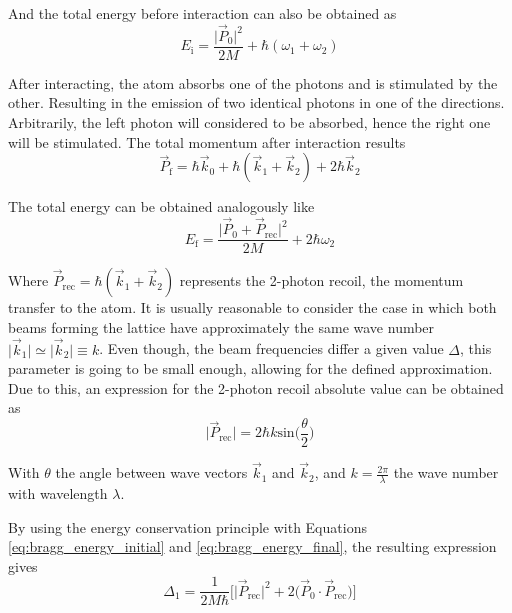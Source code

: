And the total energy before interaction can also be obtained as
\begin{equation}\label{eq:bragg_energy_initial}
	E_\text{i} = \frac{\mathopen\big|\vec{P}_0\mathclose\big|^2}{2M} + \hbar (\omega_1 + \omega_2)
\end{equation}

After interacting, the atom absorbs one of the photons and is stimulated by the other. Resulting in the emission of two identical photons in one of the directions. Arbitrarily, the left photon will considered to be absorbed, hence the right one will be stimulated. The total momentum after interaction results
\begin{equation}
	\vec{P}_\text{f} = \hbar \vec{k}_0 + \hbar (\vec{k}_1 + \vec{k}_2) + 2\hbar\vec{k}_2
\end{equation}

The total energy can be obtained analogously like 
 \begin{equation}\label{eq:bragg_energy_final}
 	E_\text{f} = \frac{\mathopen\big|\vec{P}_0+\vec{P}_\text{rec}\mathclose\big|^2}{2M} + 2\hbar\omega_2
 \end{equation}
 
Where $\vec{P}_\text{rec} = \hbar (\vec{k}_1 + \vec{k}_2)$ represents the 2-photon recoil, the momentum transfer to the atom. It is usually reasonable to consider the case in which both beams forming the lattice have approximately the same wave number $\mathopen\big|\vec{k}_1\mathclose\big| \simeq \mathopen\big|\vec{k}_2\mathclose\big| \equiv k$. Even though, the beam frequencies differ a given value $\Delta$, this parameter is going to be small enough, allowing for the defined approximation. Due to this, an expression for the 2-photon recoil absolute value can be obtained as
\begin{equation}\label{eq:two_photon_recoil}
	\mathopen\big|\vec{P}_\text{rec}\mathclose\big| = 2 \hbar k \text{sin}\bigg(\frac{\theta}{2}\bigg)
\end{equation}

With $\theta$ the angle between wave vectors $\vec{k}_1$ and $\vec{k}_2$, and $k=\frac{2\pi}{\lambda}$ the wave number with wavelength $\lambda$.

By using the energy conservation principle with Equations \eqref{eq:bragg_energy_initial} and \eqref{eq:bragg_energy_final}, the resulting expression gives
\begin{equation}\label{eq:Bragg_condition_1}
	 \Delta_1 = \frac{1}{2M\hbar}\bigg[\mathopen\big|\vec{P}_{\text{rec}}\mathclose\big|^2 + 2\big(\vec{P}_0 \cdot \vec{P}_{\text{rec}}\big)\bigg]
\end{equation}

